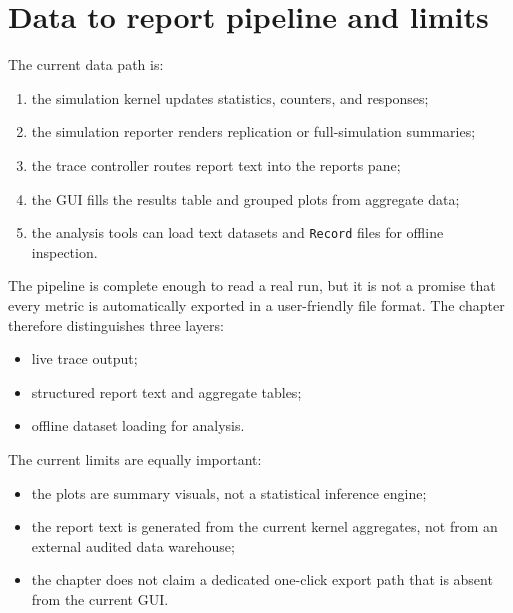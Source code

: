 \section{Data to report pipeline and limits}
\label{sec:results-data-flow}

The current data path is:
\begin{enumerate}
\item the simulation kernel updates statistics, counters, and responses;
\item the simulation reporter renders replication or full-simulation summaries;
\item the trace controller routes report text into the reports pane;
\item the GUI fills the results table and grouped plots from aggregate data;
\item the analysis tools can load text datasets and \texttt{Record} files for
offline inspection.
\end{enumerate}

The pipeline is complete enough to read a real run, but it is not a promise that
every metric is automatically exported in a user-friendly file format. The
chapter therefore distinguishes three layers:
\begin{itemize}
\item live trace output;
\item structured report text and aggregate tables;
\item offline dataset loading for analysis.
\end{itemize}

The current limits are equally important:
\begin{itemize}
\item the plots are summary visuals, not a statistical inference engine;
\item the report text is generated from the current kernel aggregates, not from
an external audited data warehouse;
\item the chapter does not claim a dedicated one-click export path that is absent
from the current GUI.
\end{itemize}

